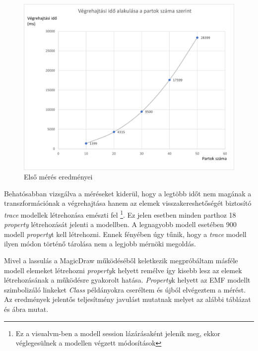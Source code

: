 \begin{figure}[!ht]
	\centering
	\includegraphics[width=12cm, keepaspectratio]{figures/evaluation/mes-1.png}
	\caption{Első mérés eredményei}
	\label{fig:mes1}
\end{figure}

Behatósabban vizsgálva a méréseket kiderül, hogy a legtöbb időt nem magának a transzformációnak a végrehajtása hanem az elemek visszakereshetőségét biztosító \emph{trace} modellek létrehozása emészti fel \footnote{Ez a visualvm-ben a modell session lázárásaként jelenik meg, ekkor véglegesülnek a modellen végzett módosítások}. Ez jelen esetben minden parthoz 18 \emph{property} létrehozását jelenti a modellben. A legnagyobb modell esetében 900 modell \emph{property}t kell létrehozni. Ennek fényében úgy tűnik, hogy a \emph{trace} modell ilyen módon történő tárolása nem a legjobb mérnöki megoldás.



Mivel a lassulás a MagicDraw működéséből keletkezik megpróbáltam másféle modell elemeket létrehozni \emph{property}k helyett remélve így kisebb lesz az elemek létrehozásának a működésre gyakorolt hatása. \emph{Property}k helyett az EMF modellt szimbolizáló linkeket \emph{Class} példányokra cseréltem és újból elvégeztem a mérést. Az eredmények jelentős teljesítmény javulást mutatnak melyet az alábbi táblázat és  ábra mutat.\\

